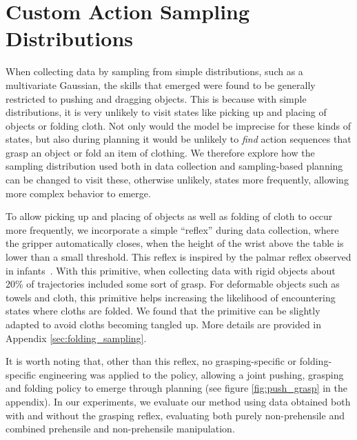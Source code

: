 \section{Custom Action Sampling Distributions}

\label{sec:system}
When collecting data by sampling from simple distributions, such as a multivariate Gaussian, the skills that emerged were found to be generally restricted to pushing and dragging objects. This is because with simple distributions, it is very unlikely to visit states like picking up and placing of objects or folding cloth. Not only would the model be imprecise for these kinds of states, but also during planning it would be unlikely to \emph{find} action sequences that grasp an object or fold an item of clothing.
We therefore explore how the sampling distribution used both in data collection and sampling-based planning can be changed to visit these, otherwise unlikely, states more frequently, allowing more complex behavior to emerge. 

To allow picking up and placing of objects as well as folding of cloth to occur more frequently, we incorporate a simple ``reflex'' during data collection, where the gripper automatically closes, when the height of the wrist above the table is lower than a small threshold. This reflex is inspired by the palmar reflex observed in infants~\cite{grasping_fetal}. With this primitive, when collecting data with rigid objects about 20\% of trajectories included some sort of grasp. For deformable objects such as towels and cloth, this primitive helps increasing the likelihood of encountering states where cloths are folded. We found that the primitive can be slightly adapted to avoid cloths becoming tangled up. More details are provided in Appendix \ref{sec:folding_sampling}.

It is worth noting that, other than this reflex, no grasping-specific or folding-specific engineering was applied to the policy, allowing a joint pushing, grasping and folding policy to emerge through planning (see figure \ref{fig:push_grasp} in the appendix). In our experiments, we evaluate our method using data obtained both with and without the grasping reflex, evaluating both purely non-prehensile and combined prehensile and non-prehensile manipulation.

